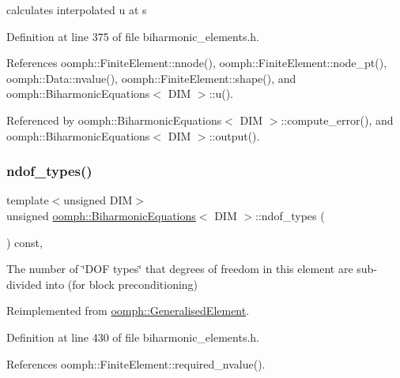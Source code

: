 calculates interpolated u at s 



Definition at line 375 of file biharmonic\+\_\+elements.\+h.



References oomph\+::\+Finite\+Element\+::nnode(), oomph\+::\+Finite\+Element\+::node\+\_\+pt(), oomph\+::\+Data\+::nvalue(), oomph\+::\+Finite\+Element\+::shape(), and oomph\+::\+Biharmonic\+Equations$<$ D\+I\+M $>$\+::u().



Referenced by oomph\+::\+Biharmonic\+Equations$<$ D\+I\+M $>$\+::compute\+\_\+error(), and oomph\+::\+Biharmonic\+Equations$<$ D\+I\+M $>$\+::output().

\mbox{\label{classoomph_1_1BiharmonicEquations_abf1fbd964ed367a0bf24854ee76aa8f4}} 
\subsubsection{\texorpdfstring{ndof\+\_\+types()}{ndof\_types()}}
{\footnotesize\ttfamily template$<$unsigned D\+IM$>$ \\
unsigned \hyperlink{classoomph_1_1BiharmonicEquations}{oomph\+::\+Biharmonic\+Equations}$<$ D\+IM $>$\+::ndof\+\_\+types (\begin{DoxyParamCaption}{ }\end{DoxyParamCaption}) const\hspace{0.3cm}{\ttfamily [inline]}, {\ttfamily [virtual]}}



The number of \char`\"{}\+D\+O\+F types\char`\"{} that degrees of freedom in this element are sub-\/divided into (for block preconditioning) 



Reimplemented from \hyperlink{classoomph_1_1GeneralisedElement_a0c6037a870597b35dcf1c780710b9a56}{oomph\+::\+Generalised\+Element}.



Definition at line 430 of file biharmonic\+\_\+elements.\+h.



References oomph\+::\+Finite\+Element\+::required\+\_\+nvalue().

\mbox{\label{classoomph_1_1BiharmonicEquations_a65124187a9935b51b6c635f457d0fa2c}} 
